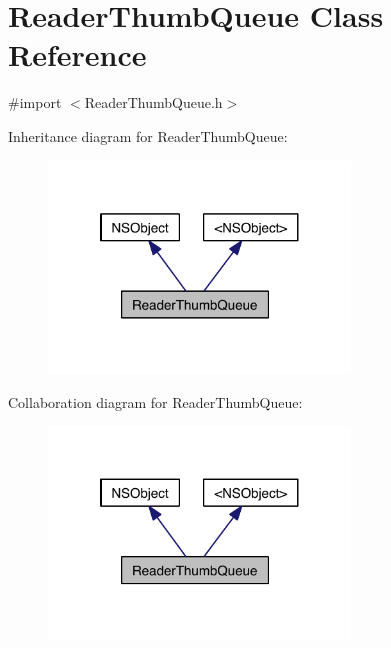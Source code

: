 \hypertarget{interface_reader_thumb_queue}{\section{Reader\-Thumb\-Queue Class Reference}
\label{df/d91/interface_reader_thumb_queue}
}


{\ttfamily \#import $<$Reader\-Thumb\-Queue.\-h$>$}



Inheritance diagram for Reader\-Thumb\-Queue\-:
\nopagebreak
\begin{figure}[H]
\begin{center}
\leavevmode
\includegraphics[width=227pt]{d1/d32/interface_reader_thumb_queue__inherit__graph}
\end{center}
\end{figure}


Collaboration diagram for Reader\-Thumb\-Queue\-:
\nopagebreak
\begin{figure}[H]
\begin{center}
\leavevmode
\includegraphics[width=227pt]{d4/dcd/interface_reader_thumb_queue__coll__graph}
\end{center}
\end{figure}
